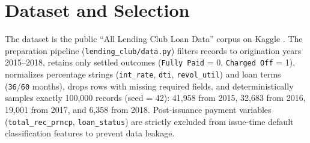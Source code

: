 \documentclass[conference]{IEEEtran}
\begin{document}
\section{Dataset and Selection}
The dataset is the public ``All Lending Club Loan Data'' corpus on Kaggle \cite{lendingclub}. The preparation pipeline (\texttt{lending\_club/data.py}) filters records to origination years 2015--2018, retains only settled outcomes (\texttt{Fully Paid} = 0, \texttt{Charged Off} = 1), normalizes percentage strings (\texttt{int\_rate}, \texttt{dti}, \texttt{revol\_util}) and loan terms (\texttt{36}/\texttt{60} months), drops rows with missing required fields, and deterministically samples exactly 100,000 records (seed = 42): 41,958 from 2015, 32,683 from 2016, 19,001 from 2017, and 6,358 from 2018. Post-issuance payment variables (\texttt{total\_rec\_prncp}, \texttt{loan\_status}) are strictly excluded from issue-time default classification features to prevent data leakage.
\end{document}

